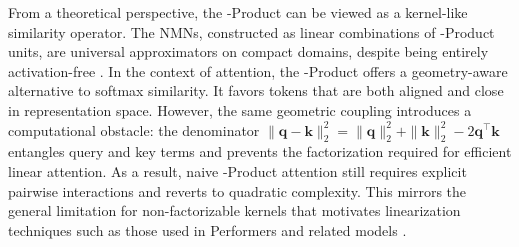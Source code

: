 \documentclass{article}
\DeclareRobustCommand{\E}{\text{\normalfont\tifinaghfont ⵟ}}
\begin{document}
From a theoretical perspective, the \E-Product can be viewed as a kernel-like similarity operator. The NMNs, constructed as linear combinations of \E-Product units, are universal approximators on compact domains, despite being entirely activation-free \citep{Author2026Concurrent}. In the context of attention, the \E-Product offers a geometry-aware alternative to softmax similarity. It favors tokens that are both aligned and close in representation space. However, the same geometric coupling introduces a computational obstacle: the denominator $\|\mathbf{q}-\mathbf{k}\|_{2}^2 = \|\mathbf{q}\|_{2}^2 + \|\mathbf{k}\|_{2}^2 - 2\mathbf{q}^\top \mathbf{k}$ entangles query and key terms and prevents the factorization required for efficient linear attention. As a result, naive \E-Product attention still requires explicit pairwise interactions and reverts to quadratic complexity. This mirrors the general limitation for non-factorizable kernels that motivates linearization techniques such as those used in Performers and related models \citep{performers, hedgehog, insuhan}.
\end{document}
